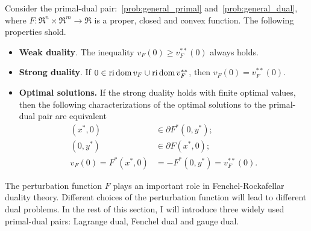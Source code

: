 \begin{theorem} Consider the primal-dual pair:~\eqref{prob:general_primal} and~\eqref{prob:general_dual}, where $F: \Re^n \times \Re^m \to \Re$ is a proper, closed and convex function. The following properties shold. 
    \begin{itemize}
        \item \textbf{Weak duality}. The inequality $v_F(0) \geq v_F^{**}(0)$ always holds. 
        \item \textbf{Strong duality}. If $0 \in \operatorname{ri}\operatorname{dom} v_F \cup \operatorname{ri}\operatorname{dom} v_F^{**}$, then $v_F(0) = v_F^{**}(0)$. 
        \item \textbf{Optimal solutions.} If the strong duality holds with finite optimal values, then the following characterizations of the optimal solutions to the primal-dual pair are equivalent
            \begin{align}
                (x^*, 0) &\in \partial F^*(0,y^*); \\
                (0, y^*) &\in \partial F(x^*,0); \\
                v_F(0) = F^*(x^*, 0) &= -F^*(0,y^*) = v_F^{**}(0).
            \end{align}
    \end{itemize}
\end{theorem}

The perturbation function $F$ plays an important role in Fenchel-Rockafellar duality theory. Different choices of the perturbation function will lead to different dual problems. In the rest of this section, I will introduce three widely used primal-dual pairs: Lagrange dual, Fenchel dual and gauge dual. 


